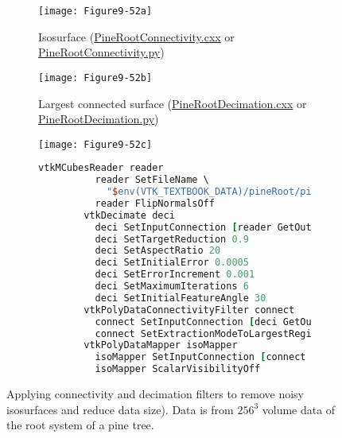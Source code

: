 \begin{figure}[htb]
    \centering
	\begin{subfigure}[h]{0.38\linewidth}
		\texttt{[image: Figure9-52a]}
		\captionsetup{justification=centering}
		\caption{Isosurface (\href{https://lorensen.github.io/VTKExamples/site/Cxx/VisualizationAlgorithms/PineRootConnectivity/}{PineRootConnectivity.cxx} or \href{https://lorensen.github.io/VTKExamples/site/Python/VisualizationAlgorithms/PineRootConnectivity/}{PineRootConnectivity.py})}
		\label{fig:Figure9-52a}
	\end{subfigure}
	\hfill
	\begin{subfigure}[h]{0.38\linewidth}
		\texttt{[image: Figure9-52b]}
		\captionsetup{justification=centering}
		\caption{Largest connected surface (\href{https://lorensen.github.io/VTKExamples/site/Cxx/VisualizationAlgorithms/PineRootDecimation/}{PineRootDecimation.cxx} or \href{https://lorensen.github.io/VTKExamples/site/Python/VisualizationAlgorithms/PineRootDecimation/}{PineRootDecimation.py})}
        \label{fig:Figure9-52b}
	\end{subfigure}
	\hfill
	\begin{subfigure}[h]{0.76\linewidth}
		\texttt{[image: Figure9-52c]}
		\captionsetup{justification=centering}
		\caption*{}
        \label{fig:Figure9-52c}
	\end{subfigure}
	\begin{subfigure}[h]{0.76\linewidth}
        \begin{lstlisting}[language=TCL,  caption={}, numbers=none, frame=none]
        vtkMCubesReader reader
          reader SetFileName \
            "$env(VTK_TEXTBOOK_DATA)/pineRoot/pine_root.tri"
          reader FlipNormalsOff
        vtkDecimate deci
          deci SetInputConnection [reader GetOutputPort]
          deci SetTargetReduction 0.9
          deci SetAspectRatio 20
          deci SetInitialError 0.0005
          deci SetErrorIncrement 0.001
          deci SetMaximumIterations 6
          deci SetInitialFeatureAngle 30
        vtkPolyDataConnectivityFilter connect
          connect SetInputConnection [deci GetOutputPort]
          connect SetExtractionModeToLargestRegion
        vtkPolyDataMapper isoMapper
          isoMapper SetInputConnection [connect GetOutputPort]
          isoMapper ScalarVisibilityOff
        \end{lstlisting}
        \label{fig:Figure9-52d}
	\end{subfigure}
	\caption{Applying connectivity and decimation filters to remove noisy isosurfaces and reduce data size). Data is from $256^3$ volume data of the root system of a pine tree.}\label{fig:Figure9-52}
\end{figure}

